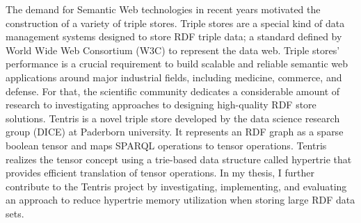 The demand for Semantic Web technologies in recent years motivated the construction of a variety of triple stores.
Triple stores are a special kind of data management systems designed to store RDF triple data; a standard defined by 
World Wide Web Consortium (W3C) to represent the data web. 
Triple stores' performance is a crucial requirement to build scalable and reliable semantic web applications around major industrial fields, including medicine, commerce, and defense. For that, the scientific community dedicates a considerable amount of research to investigating approaches to designing high-quality RDF store solutions. Tentris is a novel triple store developed by the data science research group (DICE) at Paderborn university. It represents an RDF graph as a sparse boolean tensor and maps SPARQL operations to tensor operations. Tentris realizes the tensor concept using a trie-based data structure called hypertrie that provides efficient translation of tensor operations. In my thesis, I further contribute to the Tentris project by investigating, implementing, and evaluating an approach to reduce hypertrie memory utilization when storing large RDF data sets.